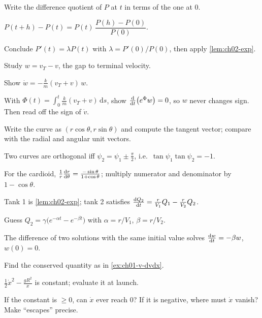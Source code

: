\begin{hintlevels}
  \item Write the difference quotient of $P$ at $t$ in terms of the one at $0$.
  \item $P(t+h) - P(t) = P(t)\,\dfrac{P(h) - P(0)}{P(0)}$.
  \item Conclude $P'(t) = \lambda P(t)$ with $\lambda = P'(0)/P(0)$, then apply
        \cref{lem:ch02-exp}.
\end{hintlevels}

\begin{hintlevels}
  \item Study $w = v_T - v$, the gap to terminal velocity.
  \item Show $\dot w = -\frac{k}{m}(v_T + v)\,w$.
  \item With $\Phi(t) = \int_0^t \frac km(v_T + v)\,\mathrm{d}s$, show
        $\frac{\mathrm{d}}{\mathrm{d}t}\bigl(e^{\Phi}w\bigr) = 0$, so $w$ never changes sign. Then
        read off the sign of $\dot v$.
\end{hintlevels}

\begin{hintlevels}
  \item Write the curve as $(r\cos\theta, r\sin\theta)$ and compute the
        tangent vector; compare with the radial and angular unit vectors.
  \item Two curves are orthogonal iff $\psi_2 = \psi_1\pm\frac\pi2$, i.e.\
        $\tan\psi_1\tan\psi_2 = -1$.
  \item For the cardioid, $\frac{1}{r}\frac{\mathrm{d}r}{\mathrm{d}\theta} = \frac{-\sin\theta}{1+\cos\theta}$;
        multiply numerator and denominator by $1 - \cos\theta$.
\end{hintlevels}

\begin{hintlevels}
  \item Tank 1 is \cref{lem:ch02-exp}; tank 2 satisfies
        $\frac{\mathrm{d}Q_2}{\mathrm{d}t} = \frac{r}{V_1}Q_1 - \frac{r}{V_2}Q_2$.
  \item Guess $Q_2 = \gamma\bigl(e^{-\alpha t} - e^{-\beta t}\bigr)$ with
        $\alpha = r/V_1$, $\beta = r/V_2$.
  \item The difference of two solutions with the same initial value solves
        $\frac{\mathrm{d}w}{\mathrm{d}t} = -\beta w$, $w(0) = 0$.
\end{hintlevels}

\begin{hintlevels}
  \item Find the conserved quantity as in \cref{ex:ch01-v-dvdx}.
  \item $\tfrac12\dot x^2 - \frac{gR^2}{x}$ is constant; evaluate it at launch.
  \item If the constant is $\ge 0$, can $\dot x$ ever reach $0$? If it is
        negative, where must $\dot x$ vanish? Make ``escapes'' precise.
\end{hintlevels}

